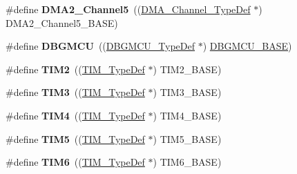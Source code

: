 \begin{DoxyCompactItemize}
\item 
\hypertarget{group___peripheral__declaration_ga521c13b7d0f82a6897d47995da392750}{\#define {\bfseries D\-M\-A2\-\_\-\-Channel5}~((\hyperlink{struct_d_m_a___channel___type_def}{D\-M\-A\-\_\-\-Channel\-\_\-\-Type\-Def} $\ast$) D\-M\-A2\-\_\-\-Channel5\-\_\-\-B\-A\-S\-E)}\label{group___peripheral__declaration_ga521c13b7d0f82a6897d47995da392750}

\item 
\hypertarget{group___peripheral__declaration_ga92ec6d9ec2251fda7d4ce09748cd74b4}{\#define {\bfseries D\-B\-G\-M\-C\-U}~((\hyperlink{struct_d_b_g_m_c_u___type_def}{D\-B\-G\-M\-C\-U\-\_\-\-Type\-Def} $\ast$) \hyperlink{group___peripheral__memory__map_ga4adaf4fd82ccc3a538f1f27a70cdbbef}{D\-B\-G\-M\-C\-U\-\_\-\-B\-A\-S\-E})}\label{group___peripheral__declaration_ga92ec6d9ec2251fda7d4ce09748cd74b4}

\item 
\hypertarget{group___peripheral__declaration_ga3cfac9f2e43673f790f8668d48b4b92b}{\#define {\bfseries T\-I\-M2}~((\hyperlink{struct_t_i_m___type_def}{T\-I\-M\-\_\-\-Type\-Def} $\ast$) T\-I\-M2\-\_\-\-B\-A\-S\-E)}\label{group___peripheral__declaration_ga3cfac9f2e43673f790f8668d48b4b92b}

\item 
\hypertarget{group___peripheral__declaration_ga61ee4c391385607d7af432b63905fcc9}{\#define {\bfseries T\-I\-M3}~((\hyperlink{struct_t_i_m___type_def}{T\-I\-M\-\_\-\-Type\-Def} $\ast$) T\-I\-M3\-\_\-\-B\-A\-S\-E)}\label{group___peripheral__declaration_ga61ee4c391385607d7af432b63905fcc9}

\item 
\hypertarget{group___peripheral__declaration_ga91a09bad8bdc7a1cb3d85cf49c94c8ec}{\#define {\bfseries T\-I\-M4}~((\hyperlink{struct_t_i_m___type_def}{T\-I\-M\-\_\-\-Type\-Def} $\ast$) T\-I\-M4\-\_\-\-B\-A\-S\-E)}\label{group___peripheral__declaration_ga91a09bad8bdc7a1cb3d85cf49c94c8ec}

\item 
\hypertarget{group___peripheral__declaration_ga5125ff6a23a2ed66e2e19bd196128c14}{\#define {\bfseries T\-I\-M5}~((\hyperlink{struct_t_i_m___type_def}{T\-I\-M\-\_\-\-Type\-Def} $\ast$) T\-I\-M5\-\_\-\-B\-A\-S\-E)}\label{group___peripheral__declaration_ga5125ff6a23a2ed66e2e19bd196128c14}

\item 
\hypertarget{group___peripheral__declaration_gac7b4ed55f9201b498b38c962cca97314}{\#define {\bfseries T\-I\-M6}~((\hyperlink{struct_t_i_m___type_def}{T\-I\-M\-\_\-\-Type\-Def} $\ast$) T\-I\-M6\-\_\-\-B\-A\-S\-E)}\label{group___peripheral__declaration_gac7b4ed55f9201b498b38c962cca97314}


\end{DoxyCompactItemize}
